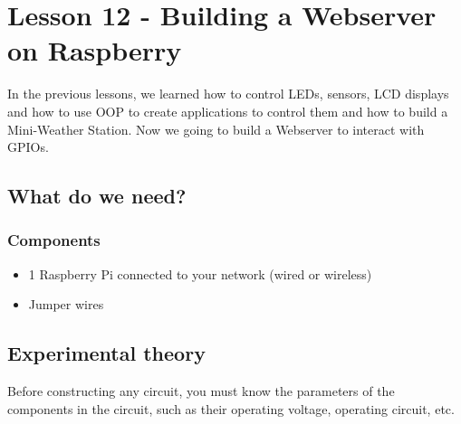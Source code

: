 \documentclass[10pt,twoside,english]{_support/latex/sbabook/sbabook}
\begin{document}
\frontmatter
\pagestyle{plain}

\tableofcontents*
\clearpage\listoffigures

\mainmatter

\chapter{Lesson 12 - Building a Webserver on Raspberry}
In the previous lessons, we learned how to control LEDs, sensors, LCD displays and how to use OOP to create applications to control them and how to build a Mini-Weather Station. Now we going to build a Webserver to interact with GPIOs.
\section{What do we need?}\subsection{Components}
\begin{itemize}
\item 1 Raspberry Pi connected to your network (wired or wireless)
\item Jumper wires
\end{itemize}
\section{Experimental theory}
Before constructing any circuit, you must know the parameters of the components in the circuit, such as their operating voltage, operating circuit, etc.
\end{document}
